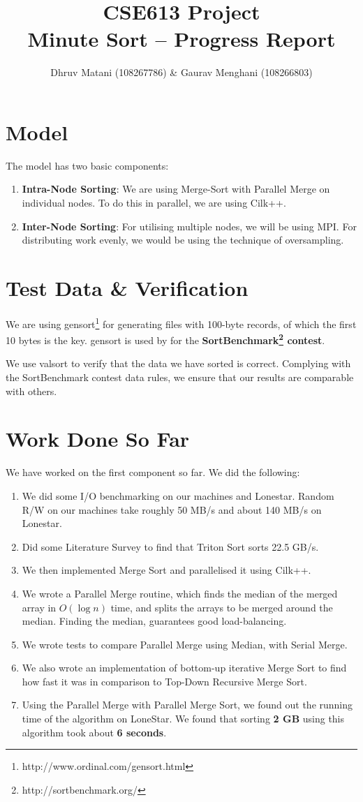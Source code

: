 \documentclass{article}
\title{CSE613 Project\\Minute Sort -- Progress Report}
\author{Dhruv Matani (108267786) \& Gaurav Menghani (108266803)}
\begin{document}
\maketitle

\clearpage

\section{Model}
The model has two basic components:
\begin{enumerate}
\item {\bf{Intra-Node Sorting}}: We are using Merge-Sort with Parallel Merge on individual nodes. To do this in parallel, 
we are using Cilk++. 

\item {\bf{Inter-Node Sorting}}: For utilising multiple nodes, we will be using MPI. For distributing work evenly, 
we would be using the technique of oversampling.
\end{enumerate}

\section{Test Data \& Verification}
We are using gensort\footnote{http://www.ordinal.com/gensort.html} for generating files with 100-byte records, 
of which the first 10 bytes is the key. gensort is used by for the {\bf SortBenchmark\footnote{http://sortbenchmark.org/} contest}.

We use valsort to verify that the data we have sorted is correct. Complying with the SortBenchmark contest data
rules, we ensure that our results are comparable with others.

\section{Work Done So Far}
We have worked on the first component so far. We did the following:
\begin{enumerate}
\item We did some I/O benchmarking on our machines and Lonestar. Random R/W on our machines take roughly 50 MB/s and about 140 MB/s on Lonestar. 
\item Did some Literature Survey to find that Triton Sort sorts 22.5 GB/s.
\item We then implemented Merge Sort and parallelised it using Cilk++.
\item We wrote a Parallel Merge routine, which finds the median of the merged array in $O(\log{n})$ time, and splits the arrays to be merged around the median. Finding the median, guarantees good load-balancing.
\item We wrote tests to compare Parallel Merge using Median, with Serial Merge.
\item We also wrote an implementation of bottom-up iterative Merge Sort to find how fast it was in comparison to Top-Down Recursive Merge Sort.
\item Using the Parallel Merge with Parallel Merge Sort, we found out the running time of the algorithm on LoneStar. We found that sorting {\bf 2 GB} using this algorithm took about {\bf 6 seconds}.
\end{enumerate}
\end{document}
